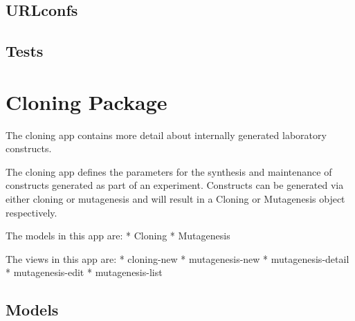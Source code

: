 \documentclass[letterpaper,10pt,english]{sphinxmanual}
\begin{document}
\subsection{URLconfs}
\label{api:id3}

\subsection{Tests}
\label{api:id4}

\section{Cloning Package}
\label{api:module-experimentdb.cloning}\label{api:cloning-package}
The cloning app contains more detail about internally generated laboratory constructs.


The cloning app defines the parameters for the synthesis and maintenance of constructs generated as part of an experiment.  Constructs can be generated via either cloning or mutagenesis and will result in a Cloning or Mutagenesis object respectively.


The models in this app are:
* Cloning
* Mutagenesis


The views in this app are:
* cloning-new
* mutagenesis-new
* mutagenesis-detail
* mutagenesis-edit
* mutagenesis-list



\subsection{Models}
\label{api:id5}\label{api:module-experimentdb.cloning.models}
\end{document}
